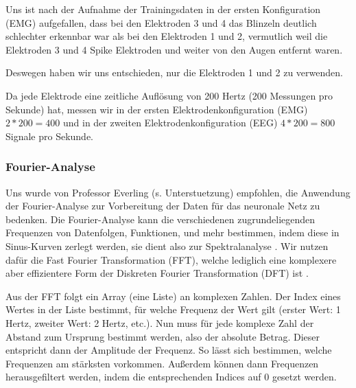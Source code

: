 \documentclass[11pt]{scrartcl}
\begin{document}
	\begin{figure}[h!]
	\end{figure}

	Uns ist nach der Aufnahme der Trainingsdaten in der ersten Konfiguration (EMG) aufgefallen, dass bei den Elektroden 3 und 4 das Blinzeln deutlich schlechter erkennbar war als bei den Elektroden 1 und 2, vermutlich weil die Elektroden 3 und 4 Spike Elektroden und weiter von den Augen entfernt waren.

	Deswegen haben wir uns entschieden, nur die Elektroden 1 und 2 zu verwenden.

	Da jede Elektrode eine zeitliche Auflösung von 200 Hertz (200 Messungen pro Sekunde) hat, messen wir in der ersten Elektrodenkonfiguration (EMG) $2 * 200 = 400$ und in der zweiten Elektrodenkonfiguration (EEG) $4 * 200 = 800$ Signale pro Sekunde.

	\subsubsection{Fourier-Analyse}
	
	Uns wurde von Professor Everling (s. \refname{Unterstuetzung}) empfohlen, die Anwendung der Fourier-Analyse zur Vorbereitung der Daten für das neuronale Netz zu bedenken. Die Fourier-Analyse kann die verschiedenen zugrundeliegenden Frequenzen von Datenfolgen, Funktionen, und mehr bestimmen, indem diese in Sinus-Kurven zerlegt werden, sie dient also zur Spektralanalyse \cite{3b1b:fft}. Wir nutzen dafür die Fast Fourier Transformation (FFT), welche lediglich eine komplexere aber effizientere Form der Diskreten Fourier Transformation (DFT) ist \cite{FFT-DFT}. 

	Aus der FFT folgt ein Array (eine Liste) an komplexen Zahlen. Der Index eines Wertes in der Liste bestimmt, für welche Frequenz der Wert gilt (erster Wert: 1 Hertz, zweiter Wert: 2 Hertz, etc.). Nun muss für jede komplexe Zahl der Abstand zum Ursprung bestimmt werden, also der absolute Betrag. Dieser entspricht dann der Amplitude der Frequenz. So lässt sich bestimmen, welche Frequenzen am stärksten vorkommen. Außerdem können dann Frequenzen herausgefiltert werden, indem die entsprechenden Indices auf 0 gesetzt werden. 
\end{document}

